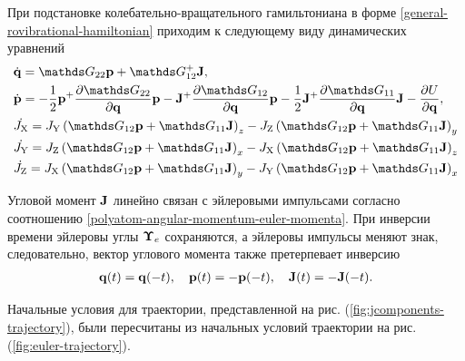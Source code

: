При подстановке колебательно-вращательного гамильтониана в форме \eqref{general-rovibrational-hamiltonian} приходим к следующему виду динамических уравнений
\begin{gather}
    \begin{aligned}
        &\dot{\mf{q}} = \bbG_{22} \mf{p} + \bbG_{12}^+ \mf{J}, \\
        &\dot{\mf{p}} = -\frac{1}{2} \mf{p}^+ \frac{\partial \bbG_{22}}{\partial \mf{q}} \mf{p} - \mf{J}^+ \frac{\partial \bbG_{12}}{\partial \mf{q}} \mf{p} - \frac{1}{2} \mf{J}^+ \frac{\partial \bbG_{11}}{\partial \mf{q}} \mf{J} - \frac{\partial U}{\partial \mf{q}}, \\
        &\dJx = \Jy \lb \bbG_{12} \mf{p} + \bbG_{11} \mf{J} \rb_z - \Jz \lb \bbG_{12} \mf{p} + \bbG_{11} \mf{J} \rb_y \\
        &\dJy = \Jz \lb \bbG_{12} \mf{p} + \bbG_{11} \mf{J} \rb_x - \Jx \lb \bbG_{12} \mf{p} + \bbG_{11} \mf{J} \rb_z \\
        &\dJz = \Jx \lb \bbG_{12} \mf{p} + \bbG_{11} \mf{J} \rb_y - \Jy \lb \bbG_{12} \mf{p} + \bbG_{11} \mf{J} \rb_x \\
    \end{aligned} \label{polyatom-jcomponents-system}
\end{gather}

Угловой момент $\mathbf{J}$ линейно связан с эйлеровыми импульсами согласно соотношению \eqref{polyatom-angular-momentum-euler-momenta}. При инверсии времени эйлеровы углы $\boldsymbol{\Upsilon}_e$ сохраняются, а эйлеровы импульсы меняют знак, следовательно, вектор углового момента также претерпевает инверсию  
\begin{gather}
    \mathbf{q}(t) = \mathbf{q}(-t), \quad \mathbf{p}(t) = -\mathbf{p}(-t), \quad \mathbf{J}(t) = -\mathbf{J}(-t).
\end{gather}

Начальные условия для траектории, представленной на рис. (\ref{fig:jcomponents-trajectory}), были пересчитаны из начальных условий траектории на рис. (\ref{fig:euler-trajectory}). 

